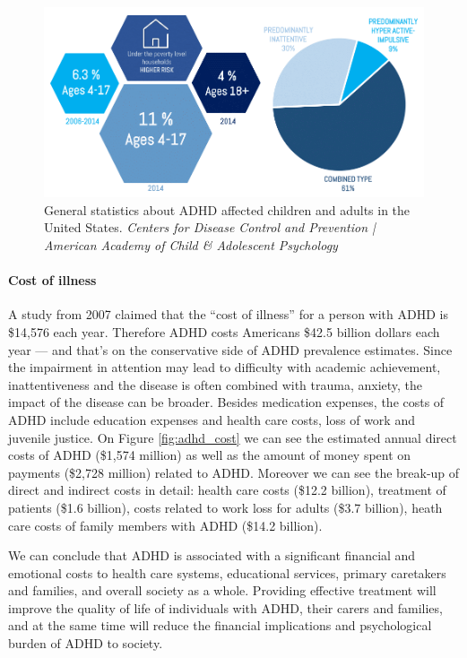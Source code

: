 \documentclass[letterpaper,10pt]{article}
\begin{document}
\vspace{4mm}
\begin{figure}[h]
\centering
\includegraphics[scale=0.3]{diagnosis.png}
\caption[General statistics about ADHD affected children and adults in the United States]{General statistics about ADHD affected children and adults in the United States. \textit{Centers for Disease Control and Prevention | American Academy of Child \& Adolescent Psychology}}
\label{fig:stat}
\end{figure}


\paragraph{Cost of illness}
A study from 2007 claimed that the “cost of illness” for a person with ADHD is \$14,576 each year. Therefore ADHD costs Americans \$42.5 billion dollars each year — and that’s on the conservative side of ADHD prevalence estimates. Since the impairment in attention may lead to difficulty with academic achievement, inattentiveness and the disease is often combined with trauma, anxiety, the impact of the disease can be broader. Besides medication expenses, the costs of ADHD include education expenses and health care costs, loss of work and juvenile justice. \cite{healthline_adhd}
On Figure \ref{fig:adhd_cost} we can see the estimated annual direct costs of ADHD (\$1,574 million) as well as the amount of money spent on payments (\$2,728 million) related to ADHD. Moreover we can see the break-up of direct and indirect costs in detail: health care costs (\$12.2 billion), treatment of patients (\$1.6 billion), costs related to work loss for adults (\$3.7 billion), heath care costs of family members with ADHD (\$14.2 billion).

We can conclude that ADHD is associated with a significant financial and emotional costs to health care systems, educational services, primary caretakers and families, and overall society as a whole. Providing effective treatment will improve the quality of life of individuals with ADHD, their carers and families, and at the same time will reduce the financial implications and psychological burden of ADHD to society. \cite{adhd_book}
\end{document}
